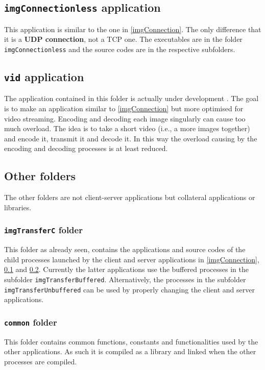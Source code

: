 \documentclass[12pt, letterpaper]{article}
\theoremstyle{definition}
\let\tb\textbf
\begin{document}
\subsection{\lstinline+imgConnectionless+ application}
\label{imgConnectionless}
This application is similar to the one in \ref{imgConnection}. The only difference that it is a \tb{UDP connection}, not a TCP one. The executables are in the folder \lstinline+imgConnectionless+ and the source codes are in the respective subfolders.

\subsection{\lstinline+vid+ application}
\label{vid}
The application contained in this folder is actually under development . The goal is to make an application similar to \ref{imgConnection} but more optimised for video streaming. Encoding and decoding each image singularly can cause too much overload. The idea is to take a short video (i.e., a more images together) and encode it, transmit it and decode it. In this way the overload causing by the encoding and decoding processes is at least reduced.

\subsection{Other folders}
The other folders are not client-server applications but collateral applications or libraries.

\subsubsection{\lstinline+imgTransferC+ folder}
This folder as already seen, contains the applications and source codes of the child processes launched by the client and server applications in \ref{imgConnection}, \ref{imgConnectionless} and \ref{vid}. Currently the latter applications use the buffered processes in the subfolder \lstinline+imgTransferBuffered+. Alternatively, the processes in the subfolder \lstinline+imgTransferUnbuffered+ can be used by properly changing the client and server applications.

\subsubsection{\lstinline+common+ folder}
This folder contains common functions, constants and functionalities used by the other applications. As such it is compiled as a library and linked when the other processes are compiled.
\end{document}
